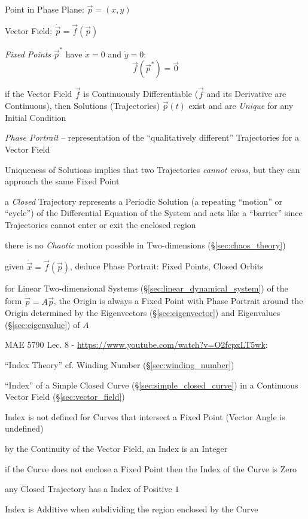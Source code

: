 Point in Phase Plane: $\vec{p} = (x,y)$

Vector Field: $\dot{\vec{p}} = \vec{f}(\vec{p})$

\emph{Fixed Points} $\vec{p}^*$ have $\dot{x} = 0$ and $\dot{y} = 0$:
\[
  \vec{f}(\vec{p}^*) = \vec{0}
\]

if the Vector Field $\vec{f}$ is Continuously Differentiable ($\vec{f}$ and its
Derivative are Continuous), then Solutions (Trajectories) $\vec{p}(t)$ exist
and are \emph{Unique} for any Initial Condition

\emph{Phase Portrait} -- representation of the ``qualitatively different''
Trajectories for a Vector Field

Uniqueness of Solutions implies that two Trajectories \emph{cannot cross}, but
they can approach the same Fixed Point

a \emph{Closed} Trajectory represents a Periodic Solution (a repeating
``motion'' or ``cycle'') of the Differential Equation of the System and acts
like a ``barrier'' since Trajectories cannot enter or exit the enclosed region

there is no \emph{Chaotic} motion possible in Two-dimensions
(\S\ref{sec:chaos_theory})

given $\dot{\vec{x}} = \vec{f}(\vec{p})$, deduce Phase Portrait: Fixed Points,
Closed Orbits

for Linear Two-dimensional Systems (\S\ref{sec:linear_dynamical_system}) of the
form $\dot{\vec{p}} = A\vec{p}$, the Origin is always a Fixed Point with Phase
Portrait around the Origin determined by the Eigenvectors
(\S\ref{sec:eigenvector}) and Eigenvalues (\S\ref{sec:eigenvalue}) of $A$


MAE 5790 Lec. 8 - \url{https://www.youtube.com/watch?v=O2fcpxLT5wk}:

``Index Theory'' \fist cf. Winding Number (\S\ref{sec:winding_number})

``Index'' of a Simple Closed Curve (\S\ref{sec:simple_closed_curve}) in a
Continuous Vector Field (\S\ref{sec:vector_field})

Index is not defined for Curves that intersect a Fixed Point (Vector Angle is
undefined)

by the Continuity of the Vector Field, an Index is an Integer

if the Curve does not enclose a Fixed Point then the Index of the Curve is Zero

any Closed Trajectory has a Index of Positive $1$

Index is Additive when subdividing the region enclosed by the Curve

